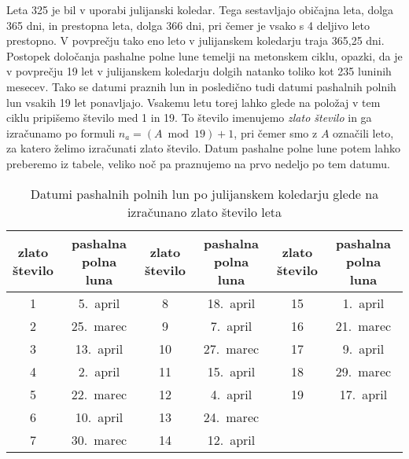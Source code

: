 \documentclass[a4paper,12pt]{article}
\begin{document}
Leta 325 je bil v uporabi julijanski koledar. Tega sestavljajo običajna leta, 
dolga 365 dni, in prestopna leta, dolga 366 dni, pri čemer je vsako s 4 
deljivo leto prestopno. V povprečju tako eno leto v julijanskem koledarju 
traja 365,25 dni. Postopek določanja pashalne polne lune temelji na metonskem 
ciklu, opazki, da je v povprečju 19 let v julijanskem koledarju dolgih natanko 
toliko kot 235 luninih mesecev. Tako se datumi praznih lun in posledično tudi 
datumi pashalnih polnih lun vsakih 19 let ponavljajo. Vsakemu letu torej lahko 
glede na položaj v tem ciklu pripišemo število med 1 in 19. To število imenujemo 
\emph{zlato število} in ga izračunamo po formuli $n_a = (A \bmod 19) + 1$, pri 
čemer smo z $A$ označili leto, za katero želimo izračunati zlato število. Datum 
pashalne polne lune potem lahko preberemo iz tabele, veliko noč pa praznujemo 
na prvo nedeljo po tem datumu. %

\begin{table}
    \centering
    \caption{Datumi pashalnih polnih lun po julijanskem koledarju glede na izračunano zlato število leta}
    \label{julijanski-t}
    \begin{tabular}{| c c | c c | c c |}
        \hline
        \makecell{zlato \\ število} & \makecell{pashalna \\ polna luna} & \makecell{zlato \\ število} & \makecell{pashalna \\ polna luna} & \makecell{zlato \\ število} & \makecell{pashalna \\ polna luna} \\ \hline
        1 & 5.\ april & 8 & 18.\ april & 15 & 1.\ april \\  
        2 & 25.\ marec & 9 & 7.\ april & 16 & 21.\ marec \\
        3 & 13.\ april & 10 & 27.\ marec & 17 & 9.\ april \\
        4 & 2.\ april & 11 & 15.\ april & 18 & 29.\ marec \\
        5 & 22.\ marec & 12 & 4.\ april & 19 & 17.\ april \\
        6 & 10.\ april & 13 & 24.\ marec & & \\
        7 & 30.\ marec & 14 & 12.\ april & & \\ \hline
    \end{tabular}
\end{table}
\end{document}
